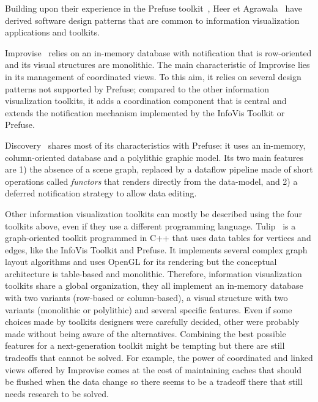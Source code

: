 Building upon their experience in the Prefuse toolkit~\cite{Prefuse},
Heer et Agrawala~\cite{DesignPatternsIV} have derived software design
patterns that are common to information visualization applications and
toolkits. 

Improvise~\cite{Improvise} relies on an in-memory database with
notification that is row-oriented and its visual structures are
monolithic.  The main characteristic of Improvise lies in its
management of coordinated views.  To this aim, it relies on several
design patterns not supported by Prefuse; compared to the other
information visualization toolkits, it adds a coordination component
that is central and extends the notification mechanism implemented
by the InfoVis Toolkit or Prefuse.

Discovery~\cite{Discovery1,Discovery2,Discovery3} shares most of its
characteristics with Prefuse: it uses an in-memory, column-oriented
database and a polylithic graphic model. Its two main features are 1)
the absence of a scene graph, replaced by a dataflow pipeline made of
short operations called \emph{functors} that renders directly from the
data-model, and 2) a deferred notification strategy to allow data
editing.


Other information visualization toolkits can mostly be described using
the four toolkits above, even if they use a different programming
language.  Tulip~\cite{Tulip} is a graph-oriented toolkit programmed
in C++ that uses data tables for vertices and edges, like the InfoVis
Toolkit and Prefuse.  It implements several complex graph layout
algorithms and uses OpenGL for its rendering but the conceptual
architecture is table-based and monolithic.  Therefore, information
visualization toolkits share a global organization, they all implement
an in-memory database with two variants (row-based or column-based), a
visual structure with two variants (monolithic or polylithic) and
several specific features.  Even if some choices made by toolkits
designers were carefully decided, other were probably made without
being aware of the alternatives.  Combining the best possible features
for a next-generation toolkit might be tempting but there are still
tradeoffs that cannot be solved.  For example, the power of
coordinated and linked views offered by Improvise comes at the cost of
maintaining caches that should be flushed when the data change so
there seems to be a tradeoff there that still needs research to be
solved.

